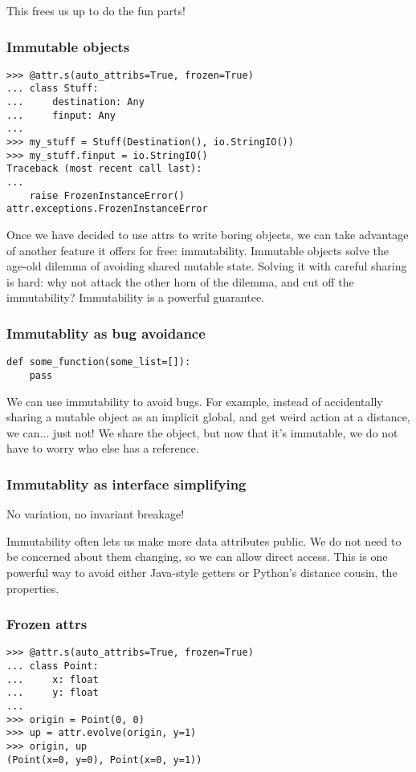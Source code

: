 \documentclass[ignorenonframetext,aspectration=169]{beamer}
\begin{document}
This frees us up to do the fun parts!

\begin{frame}[fragile]
\frametitle{Immutable objects}

\begin{lstlisting}
>>> @attr.s(auto_attribs=True, frozen=True)
... class Stuff:
...     destination: Any
...     finput: Any
... 
>>> my_stuff = Stuff(Destination(), io.StringIO())
>>> my_stuff.finput = io.StringIO()
Traceback (most recent call last):
...
    raise FrozenInstanceError()
attr.exceptions.FrozenInstanceError
\end{lstlisting}

\end{frame}

Once we have decided to use attrs to write boring objects,
we can take advantage of another feature it offers
for free:
immutability.
Immutable objects solve the age-old dilemma of avoiding shared mutable state.
Solving it with careful sharing is hard:
why not attack the other horn of the dilemma,
and cut off the immutability?
Immutability is a powerful guarantee.

\begin{frame}[fragile]
\frametitle{Immutablity as bug avoidance}

\begin{lstlisting}
def some_function(some_list=[]):
    pass
\end{lstlisting}

\end{frame}

We can use immutability to avoid bugs.
For example,
instead of accidentally sharing a mutable object
as an implicit global,
and get weird action at a distance,
we can...
just not!
We share the object,
but now that it's immutable,
we do not have to worry who else has a reference.

\begin{frame}[fragile]
\frametitle{Immutablity as interface simplifying}

No variation, no invariant breakage!
\end{frame}

Immutability often lets us make more data attributes public.
We do not need to be concerned about them changing,
so we can allow direct access.
This is one powerful way to avoid either Java-style
getters
or Python's distance cousin,
the properties.

\begin{frame}[fragile]
\frametitle{Frozen attrs}

\begin{lstlisting}
>>> @attr.s(auto_attribs=True, frozen=True)
... class Point:
...     x: float
...     y: float
... 
>>> origin = Point(0, 0)
>>> up = attr.evolve(origin, y=1)
>>> origin, up
(Point(x=0, y=0), Point(x=0, y=1))
\end{lstlisting}

\end{frame}
\end{document}
